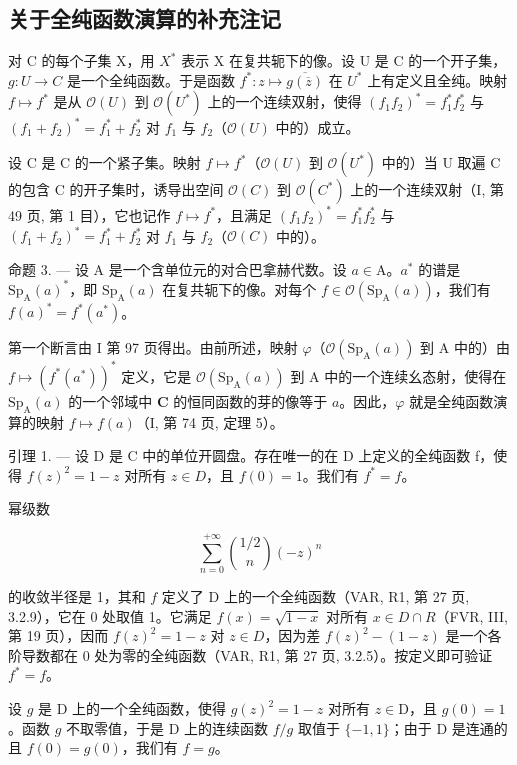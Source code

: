 \subsection{关于全纯函数演算的补充注记}

对 C 的每个子集 X，用 \(X^{*}\) 表示 X 在复共轭下的像。设 U 是 C 的一个开子集，\(g: U \to C\) 是一个全纯函数。于是函数 \(f^{*}: z \mapsto \overline{g(\overline{z})}\) 在 \(U^{*}\) 上有定义且全纯。映射 \(f \mapsto f^{*}\) 是从 \(\mathcal{O}(U)\) 到 \(\mathcal{O}(U^{*})\) 上的一个连续双射，使得 \((f_{1}f_{2})^{*} = f_{1}^{*}f_{2}^{*}\) 与 \((f_{1} + f_{2})^{*} = f_{1}^{*} + f_{2}^{*}\) 对 \(f_{1}\) 与 \(f_{2}\)（\(\mathcal{O}(U)\) 中的）成立。

设 C 是 C 的一个紧子集。映射 \(f \mapsto f^{*}\)（\(\mathcal{O}(U)\) 到 \(\mathcal{O}(U^{*})\) 中的）当 U 取遍 C 的包含 C 的开子集时，诱导出空间 \(\mathcal{O}(C)\) 到 \(\mathcal{O}(C^{*})\) 上的一个连续双射（I, 第 49 页, 第 1 目），它也记作 \(f \mapsto f^{*}\)，且满足 \((f_{1}f_{2})^{*} = f_{1}^{*}f_{2}^{*}\) 与 \((f_{1} + f_{2})^{*} = f_{1}^{*} + f_{2}^{*}\) 对 \(f_{1}\) 与 \(f_{2}\)（\(\mathcal{O}(C)\) 中的）。

命题 3. --- 设 A 是一个含单位元的对合巴拿赫代数。设 \(a \in \mathrm{A}\)。\(a^{*}\) 的谱是 \(\mathrm{Sp}_{\mathrm{A}}(a)^{*}\)，即 \(\mathrm{Sp}_{\mathrm{A}}(a)\) 在复共轭下的像。对每个 \(f \in \mathcal{O}(\mathrm{Sp}_{\mathrm{A}}(a))\)，我们有 \(f(a)^{*} = f^{*}(a^{*})\)。

第一个断言由 I 第 97 页得出。由前所述，映射 \(\varphi\)（\(\mathcal{O}(\mathrm{Sp}_{\mathrm{A}}(a))\) 到 A 中的）由 \(f \mapsto (f^{*}(a^{*}))^{*}\) 定义，它是 \(\mathcal{O}(\mathrm{Sp}_{\mathrm{A}}(a))\) 到 A 中的一个连续幺态射，使得在 \(\mathrm{Sp}_{\mathrm{A}}(a)\) 的一个邻域中 \(\mathbf{C}\) 的恒同函数的芽的像等于 \(a\)。因此，\(\varphi\) 就是全纯函数演算的映射 \(f \mapsto f(a)\)（I, 第 74 页, 定理 5）。

引理 1. --- 设 D 是 C 中的单位开圆盘。存在唯一的在 D 上定义的全纯函数 f，使得 \(f(z)^{2} = 1 - z\) 对所有 \(z \in D\)，且 \(f(0) = 1\)。我们有 \(f^{*} = f\)。

幂级数

\[
\sum_ {n = 0} ^ {+ \infty} \binom {1 / 2} {n} (- z) ^ {n}
\]

的收敛半径是 1，其和 \(f\) 定义了 D 上的一个全纯函数（VAR, R1, 第 27 页, 3.2.9），它在 0 处取值 1。它满足 \(f(x)=\sqrt{1-x}\) 对所有 \(x \in D \cap R\)（FVR, III, 第 19 页），因而 \(f(z)^{2} = 1 - z\) 对 \(z \in D\)，因为差 \(f(z)^{2} - (1 - z)\) 是一个各阶导数都在 0 处为零的全纯函数（VAR, R1, 第 27 页, 3.2.5）。按定义即可验证 \(f^{*} = f\)。

设 \(g\) 是 D 上的一个全纯函数，使得 \(g(z)^2 = 1 - z\) 对所有 \(z \in \mathrm{D}\)，且 \(g(0) = 1\)。函数 \(g\) 不取零值，于是 D 上的连续函数 \(f / g\) 取值于 \(\{-1, 1\}\)；由于 D 是连通的且 \(f(0) = g(0)\)，我们有 \(f = g\)。
\relax{}
